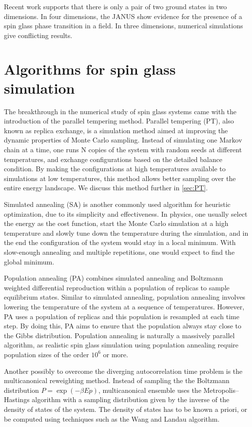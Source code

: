 Recent work supports that there is only a pair of two ground states in two dimensions.
In four dimensions, the JANUS show evidence for the presence of a spin glass
phase transition in a field. In three dimensions, numerical simulations give 
conflicting results.


\section{Algorithms for spin glass simulation}
The breakthrough in the numerical study of spin glass systems came with the 
introduction of the parallel tempering method. Parallel tempering (PT), also known
as replica exchange, is a simulation method aimed at improving the dynamic 
properties of Monte Carlo sampling. Instead of simulating one Markov chain at 
a time, one runs N copies of the system with random seeds at different 
temperatures, and exchange configurations based on the detailed balance condition.
By making the configurations at high temperatures available to simulations at 
low temperatures, this method allows better sampling over the entire energy
landscape. We discuss this method further in \ref{sec:PT}.

Simulated annealing (SA) is another commonly used algorithm for heuristic optimization,
due to its simplicity and effectiveness. In physics, one usually select the 
energy as the cost function, start the Monte Carlo simulation at a high temperature
and slowly tune down the temperature during the simulation, and in the end the
configuration of the system would stay in a local minimum. With slow-enough annealing
and multiple repetitions, one would expect to find the global minimum.  

Population annealing (PA) combines simulated annealing and Boltzmann weighted 
differential reproduction within a population of replicas to sample equilibrium 
states. Similar to simulated annealing, population annealing involves lowering 
the temperature of the system at a sequence of temperatures. However, PA uses a 
population of replicas and this population is resampled at each time step.
By doing this, PA aims to ensure that the population always stay close to the 
Gibbs distribution. Population annealing is naturally a massively
parallel algorithm, as realistic spin glass simulation using population 
annealing require population sizes of the order $10^6$ or more.

Another possibly to overcome the diverging autocorrelation time problem is the 
multicanonical reweighting method. Instead of sampling the the Boltzmann 
distribution $P=\exp(-\beta Ep)$, multicanonical ensemble uses the 
Metropolis–Hastings algorithm with a sampling distribution given by the inverse 
of the density of states of the system. The density of states has to be known 
a priori, or be computed using techniques such as the Wang and Landau algorithm.



